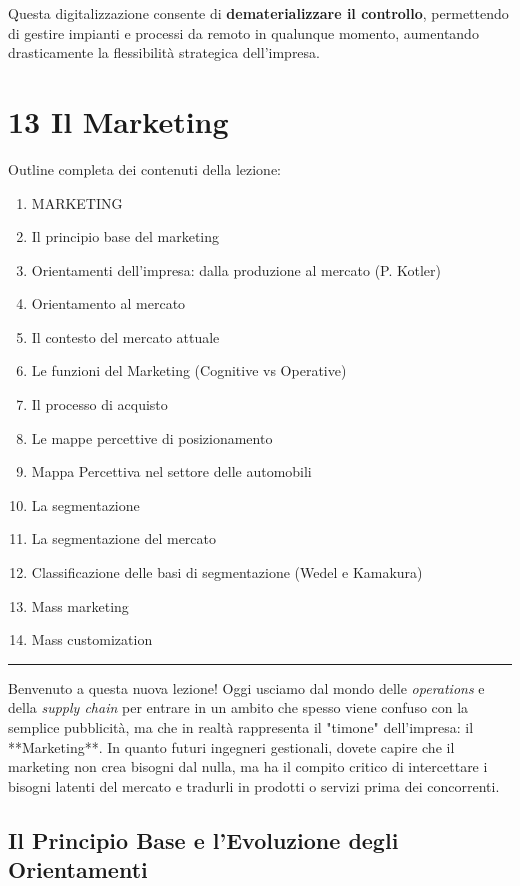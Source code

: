 \documentclass[a4paper,10pt]{article}
\begin{document}
Questa digitalizzazione consente di \textbf{dematerializzare il controllo}, permettendo di gestire impianti e processi da remoto in qualunque momento, aumentando drasticamente la flessibilità strategica dell'impresa.
\section*{13 Il Marketing}

Outline completa dei contenuti della lezione:
{\small
\begin{enumerate}
\item MARKETING
\item Il principio base del marketing
\item Orientamenti dell’impresa: dalla produzione al mercato (P. Kotler)
\item Orientamento al mercato
\item Il contesto del mercato attuale
\item Le funzioni del Marketing (Cognitive vs Operative)
\item Il processo di acquisto
\item Le mappe percettive di posizionamento
\item Mappa Percettiva nel settore delle automobili
\item La segmentazione
\item La segmentazione del mercato
\item Classificazione delle basi di segmentazione (Wedel e Kamakura)
\item Mass marketing
\item Mass customization
\end{enumerate}
}
\hrule
\vspace{0.5cm}

Benvenuto a questa nuova lezione! Oggi usciamo dal mondo delle \textit{operations} e della \textit{supply chain} per entrare in un ambito che spesso viene confuso con la semplice pubblicità, ma che in realtà rappresenta il "timone" dell'impresa: il **Marketing**. In quanto futuri ingegneri gestionali, dovete capire che il marketing non crea bisogni dal nulla, ma ha il compito critico di intercettare i bisogni latenti del mercato e tradurli in prodotti o servizi prima dei concorrenti.

\subsection*{Il Principio Base e l'Evoluzione degli Orientamenti}
\end{document}
